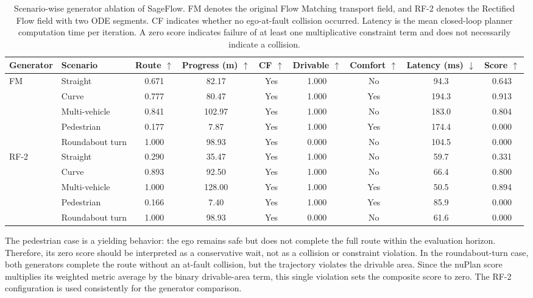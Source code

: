 \begin{table}[t]
    \centering
    \small
    \caption{Scenario-wise generator ablation of SageFlow.  FM denotes
    the original Flow Matching transport field, and RF-2 denotes the
    Rectified Flow field with two ODE segments.  CF indicates whether
    no ego-at-fault collision occurred.  Latency is the mean
    closed-loop planner computation time per iteration.  A zero score
    indicates failure of at least one multiplicative constraint term
    and does not necessarily indicate a collision.}
    \label{tab:sageflow_generator_ablation}
    \begin{tabular}{llccccccc}
        \toprule
        Generator & Scenario & Route \(\uparrow\) & Progress (m) \(\uparrow\)
        & CF \(\uparrow\) & Drivable \(\uparrow\) & Comfort \(\uparrow\)
        & Latency (ms) \(\downarrow\) & Score \(\uparrow\) \\
        \midrule
        \multirow{5}{*}{FM}
        & Straight      & 0.671 & 82.17  & Yes & 1.000 & No  & 94.3  & 0.643 \\
        & Curve         & 0.777 & 80.47  & Yes & 1.000 & Yes & 194.3 & 0.913 \\
        & Multi-vehicle & 0.841 & 102.97 & Yes & 1.000 & No  & 183.0 & 0.804 \\
        & Pedestrian    & 0.177 & 7.87   & Yes & 1.000 & Yes & 174.4 & 0.000 \\
        & Roundabout turn & 1.000 & 98.93 & Yes & 0.000 & No & 104.5 & 0.000 \\
        \midrule
        \multirow{5}{*}{RF-2}
        & Straight      & 0.290 & 35.47  & Yes & 1.000 & No  & 59.7  & 0.331 \\
        & Curve         & 0.893 & 92.50  & Yes & 1.000 & No  & 66.4  & 0.800 \\
        & Multi-vehicle & 1.000 & 128.00 & Yes & 1.000 & Yes & 50.5  & 0.894 \\
        & Pedestrian    & 0.166 & 7.40   & Yes & 1.000 & Yes & 85.9  & 0.000 \\
        & Roundabout turn & 1.000 & 98.93 & Yes & 0.000 & No & 61.6 & 0.000 \\
        \bottomrule
    \end{tabular}

    \vspace{0.5em}
    \parbox{0.96\textwidth}{\footnotesize
    The pedestrian case is a yielding behavior: the ego remains safe but
    does not complete the full route within the evaluation horizon.
    Therefore, its zero score should be interpreted as a conservative
    wait, not as a collision or constraint violation.  In the
    roundabout-turn case, both generators complete the route without
    an at-fault collision, but the trajectory violates the drivable
    area.  Since the nuPlan score multiplies its weighted metric
    average by the binary drivable-area term, this single violation
    sets the composite score to zero.  The RF-2 configuration is used
    consistently for the generator comparison.}
\end{table}

